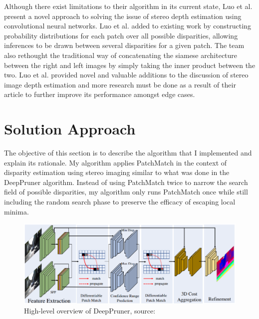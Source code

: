 \documentclass{article}
\begin{document}
Although there exist limitations to their algorithm in its current state, Luo et al. \citep{luo2016efficient} present a novel approach to solving the issue of stereo depth estimation using convolutional neural networks. Luo et al. added to existing work by constructing probability distributions for each patch over all possible disparities, allowing inferences to be drawn between several disparities for a given patch. The team also rethought the traditional way of concatenating the siamese architecture between the right and left images by simply taking the inner product between the two. Luo et al. \citep{luo2016efficient} provided novel and valuable additions to the discussion of stereo image depth estimation and more research must be done as a result of their article to further improve its performance amongst edge cases.

\section{Solution Approach}
\label{solution}
The objective of this section is to describe the algorithm that I implemented and explain its rationale. My algorithm applies PatchMatch \citep{barnes2009patchmatch} in the context of disparity estimation using stereo imaging similar to what was done in the DeepPruner \citep{duggal2019deeppruner} algorithm. Instead of using PatchMatch twice to narrow the search field of possible disparities, my algorithm only runs PatchMatch once while still including the random search phase to preserve the efficacy of escaping local minima.
\begin{figure}[ht]
\vskip 0.0in
\begin{center}
\centerline{\includegraphics[width=\columnwidth]{Figure1.png}}
\caption{High-level overview of DeepPruner, source: \citep{duggal2019deeppruner}}
\label{figure1}
\end{center}
\vskip -0.2in
\end{figure}
\end{document}
